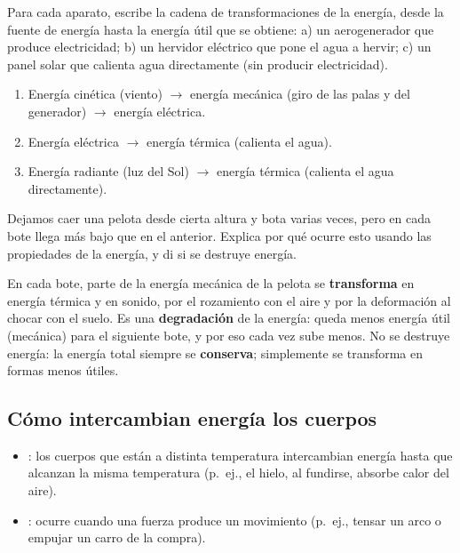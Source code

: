 \begin{exercise}
    Para cada aparato, escribe la cadena de transformaciones de la energía, desde la fuente de energía hasta la energía útil que se obtiene: a) un aerogenerador que produce electricidad; b) un hervidor eléctrico que pone el agua a hervir; c) un panel solar que calienta agua directamente (sin producir electricidad).
    \begin{solu}
        \begin{enumerate}[label=\alph*)]
            \item Energía cinética (viento) \(\to\) energía mecánica (giro de las palas y del generador) \(\to\) energía eléctrica.
            \item Energía eléctrica \(\to\) energía térmica (calienta el agua).
            \item Energía radiante (luz del Sol) \(\to\) energía térmica (calienta el agua directamente).
        \end{enumerate}
    \end{solu}
\end{exercise}

\begin{exercise}
    Dejamos caer una pelota desde cierta altura y bota varias veces, pero en cada bote llega más bajo que en el anterior. Explica por qué ocurre esto usando las propiedades de la energía, y di si se destruye energía.
    \begin{solu}
        En cada bote, parte de la energía mecánica de la pelota se \textbf{transforma} en energía térmica y en sonido, por el rozamiento con el aire y por la deformación al chocar con el suelo. Es una \textbf{degradación} de la energía: queda menos energía útil (mecánica) para el siguiente bote, y por eso cada vez sube menos. No se destruye energía: la energía total siempre se \textbf{conserva}; simplemente se transforma en formas menos útiles.
    \end{solu}
\end{exercise}

\subsection{Cómo intercambian energía los cuerpos}

\begin{itemize}
    \item {}: los cuerpos que están a distinta temperatura intercambian energía hasta que alcanzan la misma temperatura (p.\ ej., el hielo, al fundirse, absorbe calor del aire).
    \item {}: ocurre cuando una fuerza produce un movimiento (p.\ ej., tensar un arco o empujar un carro de la compra).
\end{itemize}

